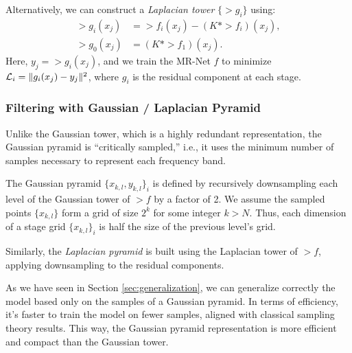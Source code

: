 
Alternatively, we can construct a \textit{Laplacian tower} $\{\gt{g}_i\}$ using:
\begin{align*}
    \gt{g}_i(x_j) &= \gt{f}_i(x_j) - \left(K * \gt{f}_i\right)(x_j), \\
    \gt{g}_0(x_j) &= \left(K * \gt{f}_1\right)(x_j).
\end{align*}
Here, $y_j = \gt{g}_i(x_j)$, and we train the MR-Net $f$ to minimize $\mathcal{L}_i = \lVert g_i(x_j)-y_j\rVert^2$, where $g_i$ is the residual component at each stage.


\subsubsection{Filtering with Gaussian / Laplacian Pyramid}

Unlike the Gaussian tower, which is a highly redundant representation, the Gaussian pyramid is ``critically sampled,'' i.e., it uses the minimum number of samples necessary to represent each frequency band.

The Gaussian pyramid $\{x_{k,l}, y_{k,l}\}_i$ is defined by recursively downsampling each level of the Gaussian tower of $\gt{f}$ by a factor of 2. We assume the sampled points $\{x_{k,l}\}$ form a grid of size $2^k$ for some integer $k>N$. Thus, each dimension of a stage grid $\{x_{k,l}\}_i$ is half the size of the previous level's grid.

Similarly, the \textit{Laplacian pyramid} is built using the Laplacian tower of $\gt{f}$, applying downsampling to the residual components.

As we have seen in Section \ref{sec:generalization}, we can generalize correctly the model based only on the samples of a Gaussian pyramid. In terms of efficiency, it's faster to train the model on fewer samples, aligned with classical sampling theory results. This way, the Gaussian pyramid representation is more efficient and compact than the Gaussian tower. 

